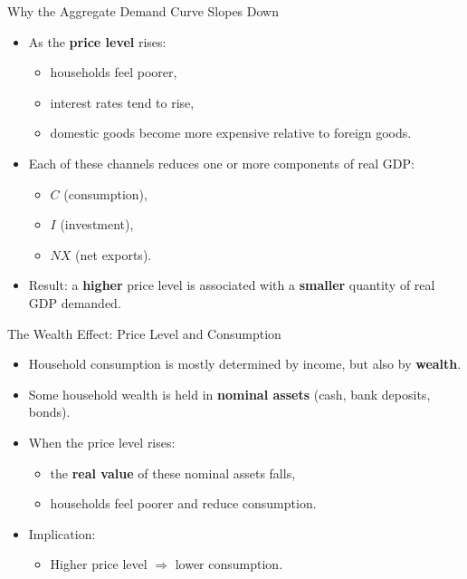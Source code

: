 \documentclass[aspectratio=169]{beamer}
\begin{document}

\begin{frame}{Why the Aggregate Demand Curve Slopes Down}
\transfade
\begin{itemize}
  \item As the \textbf{price level} rises:
  \begin{itemize}
    \item households feel poorer,
    \item interest rates tend to rise,
    \item domestic goods become more expensive relative to foreign goods.
  \end{itemize}
  \item Each of these channels reduces one or more components of real GDP:
  \begin{itemize}
    \item \(C\) (consumption),
    \item \(I\) (investment),
    \item \(NX\) (net exports).
  \end{itemize}
  \item Result: a \textbf{higher} price level is associated with a \textbf{smaller} quantity of real GDP demanded.
\end{itemize}
\end{frame}

\begin{frame}{The Wealth Effect: Price Level and Consumption}
\transfade
\begin{itemize}
  \item Household consumption is mostly determined by income, but also by \textbf{wealth}.
  \item Some household wealth is held in \textbf{nominal assets} (cash, bank deposits, bonds).
  \item When the price level rises:
  \begin{itemize}
    \item the \textbf{real value} of these nominal assets falls,
    \item households feel poorer and reduce consumption.
  \end{itemize}
  \item Implication:
  \begin{itemize}
    \item \alert{Higher price level} \(\Rightarrow\) \alert{lower consumption}.
  \end{itemize}
\end{itemize}
\end{frame}
\end{document}
